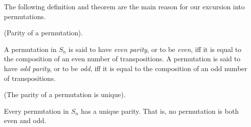 The following definition and theorem are the main reason for our excursion into permutations.

\begin{defn}
    (Parity of a permutation).

    A permutation in $S_n$ is said to have \textit{even parity}, or to be \textit{even}, iff it is equal to the composition of an even number of transpositions. A permutation is said to have \textit{odd parity}, or to be \textit{odd}, iff it is equal to the composition of an odd number of transpositions.
\end{defn}

\begin{theorem}
    (The parity of a permutation is unique).

    Every permutation in $S_n$ has a unique parity. That is, no permutation is both even and odd.
\end{theorem}

